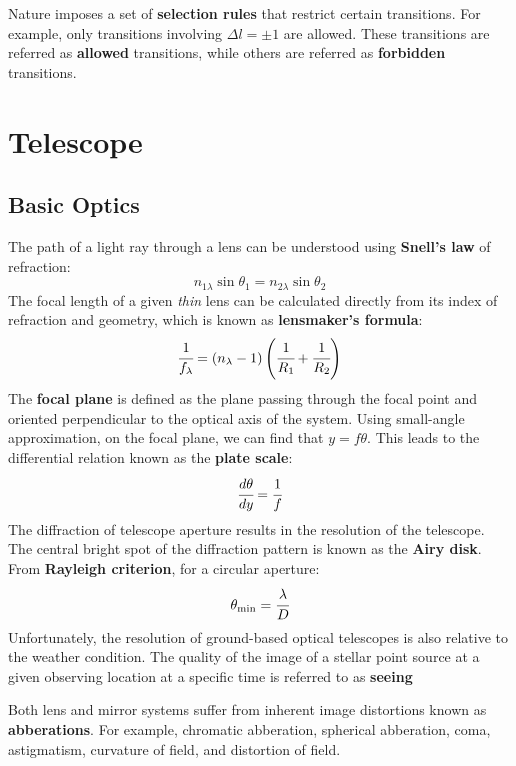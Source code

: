 \documentclass{article}
\numberwithin{equation}{section}
\numberwithin{figure}{section}
\begin{document}
	Nature imposes a set of {\bf selection rules} that restrict certain transitions. For example, only transitions involving $\Delta l = \pm 1$ are allowed. These transitions are referred as {\bf allowed} transitions, while others are referred as {\bf forbidden} transitions.
	
\section{Telescope}
	\subsection{Basic Optics}
	The path of a light ray through a lens can be understood using {\bf Snell's law} of refraction:
	\begin{equation}
		n_{1\lambda}\sin\theta_1 = n_{2\lambda}\sin\theta_2
	\end{equation}
	The focal length of a given {\it thin} lens can be calculated directly from its index of refraction and geometry, which is known as {\bf lensmaker's formula}:
	\begin{equation}
		\cfrac{1}{f_\lambda} = (n_\lambda-1)\left(\cfrac{1}{R_1}+\cfrac{1}{R_2}\right)
	\end{equation} 
	The {\bf focal plane} is defined as the plane passing through the focal point and oriented perpendicular to the optical axis of the system. Using small-angle approximation, on the focal plane, we can find that $y = f\theta$. This leads to the differential relation known as the {\bf plate scale}:
	\begin{equation}
		\cfrac{d\theta}{dy} = \cfrac{1}{f}
	\end{equation}
	The diffraction of telescope aperture results in the resolution of the telescope. The central bright spot of the diffraction pattern is known as the {\bf Airy disk}. From {\bf Rayleigh criterion}, for a circular aperture:
	\begin{equation}
		\theta_{\rm min} = 	\cfrac{\lambda}{D}
	\end{equation}
	Unfortunately, the resolution of ground-based optical telescopes is also relative to the weather condition. The quality of the image of a stellar point source at a given observing location at a specific time is referred to as {\bf seeing}
	
	Both lens and mirror systems suffer from inherent image distortions known as {\bf abberations}. For example, chromatic abberation, spherical abberation, coma, astigmatism, curvature of field, and distortion of field.
	
\end{document}
